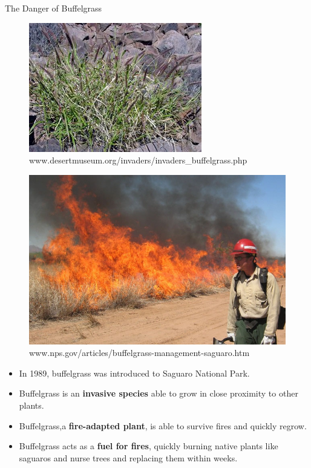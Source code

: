 \documentclass{beamer}
\begin{document}
\begin{frame}{The Danger of Buffelgrass}
\begin{minipage}{0.49\textwidth}
\begin{figure}[center]
\includegraphics[scale = 0.4]{buffelgrass.jpg}\\
\tiny{www.desertmuseum.org/invaders/invaders\_buffelgrass.php}
\end{figure}
\begin{figure}[center]
\includegraphics[scale = 0.85]{buffelgrassfire.jpg}\\
\tiny{www.nps.gov/articles/buffelgrass-management-saguaro.htm}
\end{figure}
\end{minipage}
\hfill
\begin{minipage}{0.49\textwidth}
\small{\begin{itemize}
\item In 1989, buffelgrass was introduced to Saguaro National Park.
\item<2-> Buffelgrass is an \textbf{invasive species} able to grow in close proximity to other plants.
\item<3-> Buffelgrass,a \textbf{fire-adapted plant}, is able to survive fires and quickly regrow.
\item<4-> Buffelgrass acts as a \textbf{fuel for fires}, quickly burning native plants like saguaros and nurse trees and replacing them within weeks.
\end{itemize}}
\end{minipage}
\end{frame}
\end{document}
